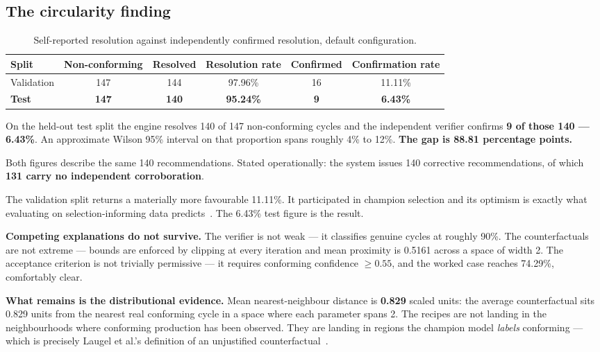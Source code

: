 \documentclass[11pt,a4paper]{article}
\begin{document}
\subsection{The circularity finding}\label{sec:circ}

\begin{table}[htbp]
\centering
\caption{Self-reported resolution against independently confirmed resolution, default configuration.}
\label{tab:circ}
\small
\begin{tabular}{@{}lccccc@{}}
\toprule
\textbf{Split} & \textbf{Non-conforming} & \textbf{Resolved} & \textbf{Resolution rate} & \textbf{Confirmed} & \textbf{Confirmation rate} \\
\midrule
Validation & 147 & 144 & 97.96\% & 16 & 11.11\% \\
\textbf{Test} & \textbf{147} & \textbf{140} & \textbf{95.24\%} & \textbf{9} & \textbf{6.43\%} \\
\bottomrule
\end{tabular}
\end{table}

On the held-out test split the engine resolves 140 of 147 non-conforming cycles and the independent verifier confirms \textbf{9 of those 140 --- 6.43\%}. An approximate Wilson 95\% interval on that proportion spans roughly 4\% to 12\%. \textbf{The gap is 88.81 percentage points.}

Both figures describe the same 140 recommendations. Stated operationally: the system issues 140 corrective recommendations, of which \textbf{131 carry no independent corroboration}.

The validation split returns a materially more favourable 11.11\%. It participated in champion selection and its optimism is exactly what evaluating on selection-informing data predicts~\cite{cawley2010}. The 6.43\% test figure is the result.

\textbf{Competing explanations do not survive.} The verifier is not weak --- it classifies genuine cycles at roughly 90\%. The counterfactuals are not extreme --- bounds are enforced by clipping at every iteration and mean proximity is 0.5161 across a space of width 2. The acceptance criterion is not trivially permissive --- it requires conforming confidence $\geq 0.55$, and the worked case reaches 74.29\%, comfortably clear.

\textbf{What remains is the distributional evidence.} Mean nearest-neighbour distance is \textbf{0.829} scaled units: the average counterfactual sits 0.829 units from the nearest real conforming cycle in a space where each parameter spans 2. The recipes are not landing in the neighbourhoods where conforming production has been observed. They are landing in regions the champion model \emph{labels} conforming --- which is precisely Laugel et al.'s definition of an unjustified counterfactual~\cite{laugel2019}.
\end{document}
